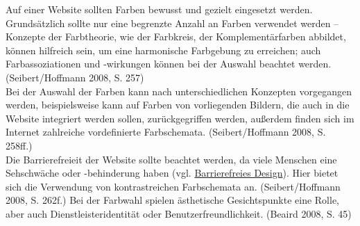 \documentclass{article}
\begin{document}
    Auf einer Website sollten Farben bewusst und gezielt eingesetzt werden. Grundsätzlich sollte nur eine begrenzte Anzahl an Farben verwendet werden – Konzepte der Farbtheorie, wie der Farbkreis, der Komplementärfarben abbildet, können hilfreich sein, um eine harmonische Farbgebung zu erreichen; auch Farbassoziationen und -wirkungen können bei der Auswahl beachtet werden. (Seibert/Hoffmann 2008, S. 257)\\
            
        Bei der Auswahl der Farben kann nach unterschiedlichen Konzepten vorgegangen werden, beispielsweise kann auf Farben von vorliegenden Bildern, die auch in die Website integriert werden sollen, zurückgegriffen werden, außerdem finden sich im Internet zahlreiche vordefinierte Farbschemata. (Seibert/Hoffmann 2008, S. 258ff.)\\
            
        Die Barrierefreieit der Website sollte beachtet werden, da viele Menschen eine Sehschwäche oder -behinderung haben (vgl. \href{http://gams.uni-graz.at/o:konde.35}{Barrierefreies Design}). Hier bietet sich die Verwendung von kontrastreichen Farbschemata an. (Seibert/Hoffmann 2008, S. 262f.) Bei der Farbwahl spielen ästhetische Gesichtspunkte eine Rolle, aber auch Dienstleisteridentität oder Benutzerfreundlichkeit. (Beaird 2008, S. 45)\\
            
\end{document}
